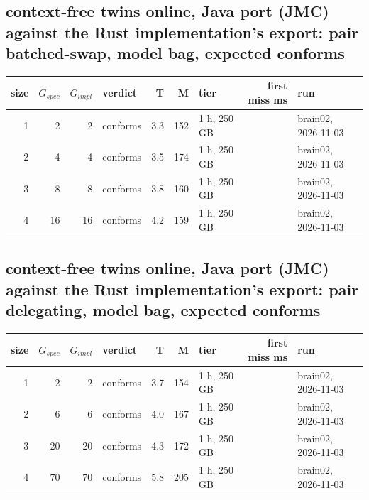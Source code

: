 \documentclass[10pt]{article}
\begin{document}
\subsection*{context-free twins online, Java port (JMC) against the Rust implementation's export: pair \textsf{batched-swap}, model bag, expected conforms}
\begin{longtable}{@{}rrrlrrlrl@{}}
\toprule
size & $G_{\mathit{spec}}$ & $G_{\mathit{impl}}$ & verdict & T & M & tier & first miss ms & run \\
\midrule
\endhead
\color{red} 1 & 2 & 2 & conforms & 3.3 & 152 & 1 h, 250 GB &  & brain02, 2026-11-03 \\
\color{red} 2 & 4 & 4 & conforms & 3.5 & 174 & 1 h, 250 GB &  & brain02, 2026-11-03 \\
\color{red} 3 & 8 & 8 & conforms & 3.8 & 160 & 1 h, 250 GB &  & brain02, 2026-11-03 \\
\color{red} 4 & 16 & 16 & conforms & 4.2 & 159 & 1 h, 250 GB &  & brain02, 2026-11-03 \\
\bottomrule
\end{longtable}
\subsection*{context-free twins online, Java port (JMC) against the Rust implementation's export: pair \textsf{delegating}, model bag, expected conforms}
\begin{longtable}{@{}rrrlrrlrl@{}}
\toprule
size & $G_{\mathit{spec}}$ & $G_{\mathit{impl}}$ & verdict & T & M & tier & first miss ms & run \\
\midrule
\endhead
\color{red} 1 & 2 & 2 & conforms & 3.7 & 154 & 1 h, 250 GB &  & brain02, 2026-11-03 \\
\color{red} 2 & 6 & 6 & conforms & 4.0 & 167 & 1 h, 250 GB &  & brain02, 2026-11-03 \\
\color{red} 3 & 20 & 20 & conforms & 4.3 & 172 & 1 h, 250 GB &  & brain02, 2026-11-03 \\
\color{red} 4 & 70 & 70 & conforms & 5.8 & 205 & 1 h, 250 GB &  & brain02, 2026-11-03 \\
\bottomrule
\end{longtable}
\end{document}
